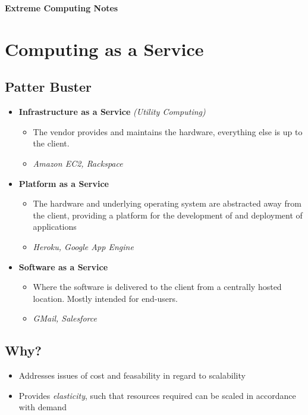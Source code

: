 \documentclass[a4paper]{article}
\begin{document}
\begin{center}
{\huge \textbf{Extreme Computing Notes}}
\end{center}

\section{Computing as a Service}

\subsection*{Patter Buster}

\begin{itemize}
\item
  \textbf{Infrastructure as a Service} \textit{(Utility Computing)}
  \begin{itemize}
  \item
    The vendor provides and maintains the hardware, everything else is up to the client.
  \item
    \textit{Amazon EC2, Rackspace}
  \end{itemize}
\item
  \textbf{Platform as a Service}
  \begin{itemize}
  \item
    The hardware and underlying operating system are abstracted away from the client, providing a platform for the development of and deployment of applications
  \item
    \textit{Heroku, Google App Engine}
  \end{itemize}
\item
  \textbf{Software as a Service}
  \begin{itemize}
  \item
    Where the software is delivered to the client from a centrally hosted location. Mostly intended for end-users.
    \item
  \textit{GMail, Salesforce}

  \end{itemize}
\end{itemize}

\subsection*{Why?}

\begin{itemize}
\item
  Addresses issues of cost and feasability in regard to scalability
\item
  Provides \textit{elasticity}, such that resources required can be scaled in accordance with demand
\end{itemize}
\end{document}
